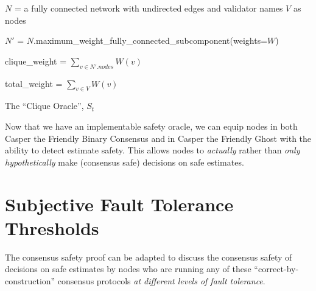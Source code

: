 \documentclass{article}
\theoremstyle{definition}
\begin{document}
\begin{algorithm}[H]



  $N$ = a fully connected network with undirected edges and validator names $V$ as nodes


  $N'$ = $N$.maximum\_weight\_fully\_connected\_subcomponent(weights=$W$)

  clique\_weight = $\sum_{v \in N'.nodes} W(v)$

  total\_weight = $\sum_{v \in V} W(v)$



\caption{The ``Clique Oracle'', $S_t$}
\end{algorithm}

Now that we have an implementable safety oracle, we can equip nodes in both Casper the Friendly Binary Consensus and in Casper the Friendly Ghost with the ability to detect estimate safety. This allows nodes to \emph{actually} rather than \emph{only hypothetically} make (consensus safe) decisions on safe estimates.


\section{Subjective Fault Tolerance Thresholds}

The consensus safety proof can be adapted to discuss the consensus safety of decisions on safe estimates by nodes who are running any of these ``correct-by-construction'' consensus protocols \emph{at different levels of fault tolerance}.
\end{document}

